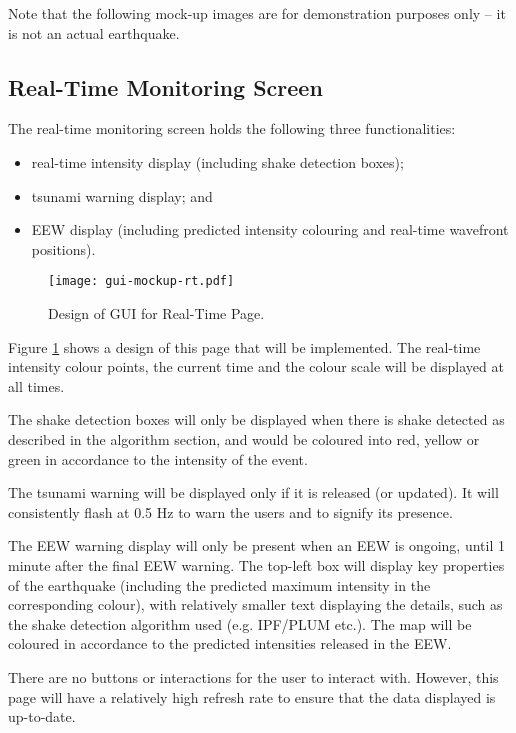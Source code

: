 Note that the following mock-up images are for demonstration purposes only -- it is not an actual earthquake.

\subsection{Real-Time Monitoring Screen}

The real-time monitoring screen holds the following three functionalities:
\begin{itemize}
    \item real-time intensity display (including shake detection boxes);
    \item tsunami warning display; and
    \item EEW display (including predicted intensity colouring and real-time wavefront positions).
\end{itemize}

\begin{figure}[htp]
    \centering
    \texttt{[image: gui-mockup-rt.pdf]}
    \caption{Design of GUI for Real-Time Page.}
    \label{fig:gui-mockup-rt}
\end{figure}

Figure \ref{fig:gui-mockup-rt} shows a design of this page that will be implemented. The real-time intensity colour points, the current time and the colour scale will be displayed at all times.

The shake detection boxes will only be displayed when there is shake detected as described in the algorithm section, and would be coloured into red, yellow or green in accordance to the intensity of the event.

The tsunami warning will be displayed only if it is released (or updated). It will consistently flash at 0.5 Hz to warn the users and to signify its presence.

The EEW warning display will only be present when an EEW is ongoing, until 1 minute after the final EEW warning. The top-left box will display key properties of the earthquake (including the predicted maximum intensity in the corresponding colour), with relatively smaller text displaying the details, such as the shake detection algorithm used (e.g. IPF/PLUM etc.). The map will be coloured in accordance to the predicted intensities released in the EEW.

There are no buttons or interactions for the user to interact with. However, this page will have a relatively high refresh rate to ensure that the data displayed is up-to-date.

